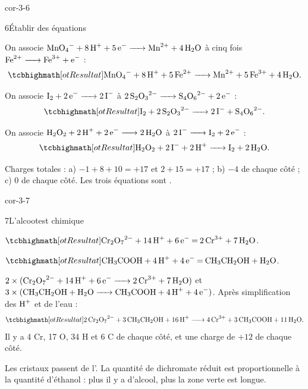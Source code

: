 \begin{blocLivre}{cor-3-6}
\begin{corrige}{6}{Établir des équations}
\begin{questions}
\item On associe $\ce{MnO4- + 8H+ + 5e- -> Mn^{2+} + 4H2O}$ à cinq fois $\ce{Fe^{2+} -> Fe^{3+} + e-}$ :
\[\res{\ce{MnO4- + 8H+ + 5Fe^{2+} -> Mn^{2+} + 5Fe^{3+} + 4H2O}}.\]
\item On associe $\ce{I2 + 2e- -> 2I-}$ à $\ce{2S2O3^{2-} -> S4O6^{2-} + 2e-}$ :
\[\res{\ce{I2 + 2S2O3^{2-} -> 2I- + S4O6^{2-}}}.\]
\item On associe $\ce{H2O2 + 2H+ + 2e- -> 2H2O}$ à $\ce{2I- -> I2 + 2e-}$ :
\[\res{\ce{H2O2 + 2I- + 2H+ -> I2 + 2H2O}}.\]
\item Charges totales : a) $-1+8+10=+17$ et $2+15=+17$ ; b) $-4$ de chaque côté ; c) $0$ de chaque côté. Les trois
équations sont .
\end{questions}
\end{corrige}
\end{blocLivre}
\begin{blocLivre}{cor-3-7}
\begin{corrige}{7}{L'alcootest chimique}
\begin{questions}
\item $\res{\ce{Cr2O7^{2-} + 14H+ + 6e- = 2Cr^{3+} + 7H2O}}$.
\item $\res{\ce{CH3COOH + 4H+ + 4e- = CH3CH2OH + H2O}}$.
\item $2\times(\ce{Cr2O7^{2-} + 14H+ + 6e- -> 2Cr^{3+} + 7H2O})$ et $3\times(\ce{CH3CH2OH + H2O -> CH3COOH + 4H+ + 4e-})$. Après
simplification des $\ce{H+}$ et de l'eau :
\[\res{\ce{2Cr2O7^{2-} + 3CH3CH2OH + 16H+ -> 4Cr^{3+} + 3CH3COOH + 11H2O}}.\]
Il y a 4 Cr, 17 O, 34 H et 6 C de chaque côté, et une charge de $+12$ de chaque côté.
\item Les cristaux passent de l'. La quantité de dichromate réduit est proportionnelle à la
quantité d'éthanol : plus il y a d'alcool, plus la zone verte est longue.
\end{questions}
\end{corrige}
\end{blocLivre}

